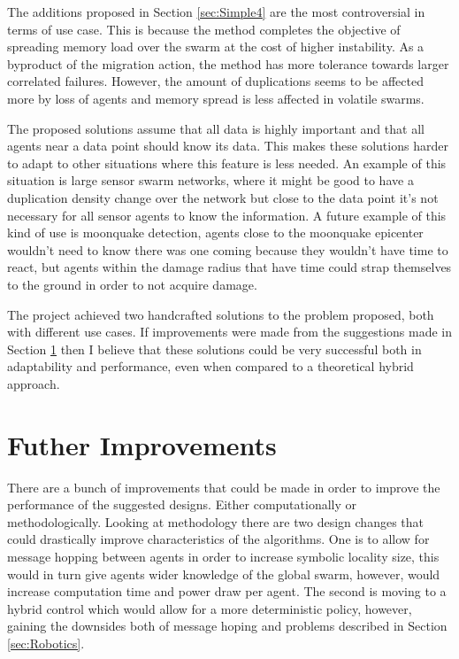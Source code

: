 \documentclass{UoYCSproject}
\begin{document}
The additions proposed in Section \ref{sec:Simple4} are the most controversial in terms of use case. 
This is because the method completes the objective of spreading memory load over the swarm at the cost of higher instability. 
As a byproduct of the migration action, the method has more tolerance towards larger correlated failures. 
However, the amount of duplications seems to be affected more by loss of agents and memory spread is less affected in volatile swarms.

The proposed solutions assume that all data is highly important and that all agents near a data point should know its data. 
This makes these solutions harder to adapt to other situations where this feature is less needed. 
An example of this situation is large sensor swarm networks, where it might be good to have a duplication density change over the network but close to the data point it's not necessary for all sensor agents to know the information. 
A future example of this kind of use is moonquake detection, agents close to the moonquake epicenter wouldn’t need to know there was one coming because they wouldn’t have time to react, but agents within the damage radius that have time could strap themselves to the ground in order to not acquire damage. 

The project achieved two handcrafted solutions to the problem proposed, both with different use cases. 
If improvements were made from the suggestions made in Section \ref{sec:further} then I believe that these solutions could be very successful both in adaptability and performance, even when compared to a theoretical hybrid approach.

\section{Futher Improvements}
\label{sec:further}

There are a bunch of improvements that could be made in order to improve the performance of the suggested designs. 
Either computationally or methodologically.
Looking at methodology there are two design changes that could drastically improve characteristics of the algorithms. 
One is to allow for message hopping between agents in order to increase symbolic locality size, this would in turn give agents wider knowledge of the global swarm, however, would increase computation time and power draw per agent. 
The second is moving to a hybrid control which would allow for a more deterministic policy, however, gaining the downsides both of message hoping and problems described in Section \ref{sec:Robotics}.
\end{document}

